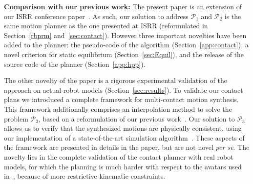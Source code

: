 \documentclass[journal]{IEEEtran}
\begin{document}
\noindent \textbf{Comparison with our previous work:}
The present paper is an extension of our ISRR conference paper~\cite{tonneauisrr15}. 
As such, our solution to address $\mathcal{P}_1$ and $\mathcal{P}_2$ is the same motion planner as the one presented at ISRR (reformulated in Section~\ref{rbprm} and~\ref{sec:contact}). 
However three important novelties have been added to the planner: the pseudo-code of the algorithm (Section~\ref{app:contact}), a novel criterion for
static equilibrium (Section~\ref{sec:Equil}), and the release of the source code of the planner (Section~\ref{app:hpp}).

The other novelty of the paper is a rigorous experimental validation of the approach on actual robot models (Section~\ref{sec:results}).
To validate our contact plans we introduced a complete framework for multi-contact motion synthesis. This framework additionally comprises an interpolation method to solve the problem $\mathcal{P}_3$,  based on a reformulation of our previous work~\cite{Carpentier2016}. Our solution to $\mathcal{P}_3$ allows us to verify that the synthesized motions are physically consistent, using our implementation of a state-of-the-art simulation algorithm~\cite{Kaufman2008}. 
These aspects of the framework are presented in details in the
paper, but are not novel \textit{per se}. %
The novelty lies in the complete
validation of the contact planner with real robot models, for
which the planning is much harder with respect to the avatars
used in~\cite{tonneauisrr15}, because of more restrictive kinematic constraints.

\end{document}
